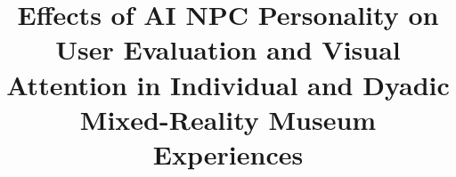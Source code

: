\documentclass[a4paper,fleqn]{cas-sc}
\begin{document}
\let\WriteBookmarks\relax
\def\floatpagepagefraction{1}
\def\textpagefraction{.001}

\shorttitle{}    

\shortauthors{}  

\title [mode = title]{Effects of AI NPC Personality on User Evaluation and Visual Attention in Individual and Dyadic Mixed-Reality Museum Experiences}  



%













\end{document}

